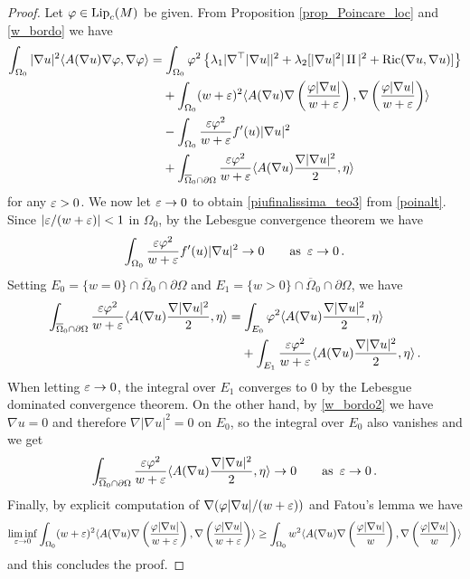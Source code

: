\documentclass[10 pt,a4paper]{article}
\theoremstyle{definition}
\begin{document}
\begin{proof}
	Let $\varphi\in\mathrm{Lip}_c(M)$ be given. From Proposition \ref{prop_Poincare_loc} and \eqref{w_bordo} we have
	\begin{equation} \label{poinalt}
		\begin{split}
			\int_{\Omega_0} |\nabla u|^2 \langle A(\nabla u)\nabla\varphi,\nabla\varphi\rangle & = \int_{\Omega_0} \varphi^2 \left\{ \lambda_1|\nabla^\top|\nabla u||^2 + \lambda_2 [|\nabla u|^2|\operatorname{II}|^2 + \mathrm{Ric}(\nabla u,\nabla u)] \right\} \\
			& \phantom{=\;} + \int_{\Omega_0} (w+\varepsilon)^2 \langle A(\nabla u)\nabla\left(\frac{\varphi|\nabla u|}{w+\varepsilon}\right),\nabla\left(\frac{\varphi|\nabla u|}{w+\varepsilon}\right)\rangle \\
			& \phantom{=\;} - \int_{\Omega_0} \frac{\varepsilon \varphi^2}{w+\varepsilon} f'(u)|\nabla u|^2 \\
			& \phantom{=\;} + \int_{\overline\Omega_0\cap\partial\Omega} \frac{\varepsilon\varphi^2}{w+\varepsilon} \langle A(\nabla u)\frac{\nabla|\nabla u|^2}{2},\eta\rangle
		\end{split}
	\end{equation}
	for any $\varepsilon>0$. We now let $\varepsilon\to0$ to obtain \eqref{piufinalissima_teo3} from \eqref{poinalt}. Since $|\varepsilon/(w+\varepsilon)|<1$ in $\Omega_0$, by the Lebesgue convergence theorem we have
	\[
	\int_{\Omega_0} \frac{\varepsilon \varphi^2}{w+\varepsilon} f'(u)|\nabla u|^2 \to 0 \qquad \text{as } \, \varepsilon \to 0 \, .
	\]
	Setting $E_0 = \{w=0\} \cap \overline\Omega_0\cap\partial\Omega$ and $E_1 = \{w>0\} \cap \overline\Omega_0\cap\partial\Omega$, we have
	\begin{align*}
		\int_{\overline\Omega_0\cap\partial\Omega} \frac{\varepsilon\varphi^2}{w+\varepsilon} \langle A(\nabla u)\frac{\nabla|\nabla u|^2}{2},\eta\rangle & = \int_{E_0} \varphi^2 \langle A(\nabla u)\frac{\nabla|\nabla u|^2}{2},\eta\rangle \\
		& \phantom{=\;} + \int_{E_1} \frac{\varepsilon\varphi^2}{w+\varepsilon} \langle A(\nabla u)\frac{\nabla|\nabla u|^2}{2},\eta\rangle \, .
	\end{align*}
	When letting $\varepsilon\to0$, the integral over $E_1$ converges to $0$ by the Lebesgue dominated convergence theorem. On the other hand, by \eqref{w_bordo2} we have $\nabla u = 0$ and therefore $\nabla|\nabla u|^2 = 0$ on $E_0$, so the integral over $E_0$ also vanishes and we get
	\[
	\int_{\overline\Omega_0\cap\partial\Omega} \frac{\varepsilon\varphi^2}{w+\varepsilon} \langle A(\nabla u)\frac{\nabla|\nabla u|^2}{2},\eta\rangle \to 0 \qquad \text{as } \, \varepsilon \to 0 \, .
	\]
	Finally, by explicit computation of $\nabla(\varphi|\nabla u|/(w+\varepsilon))$ and Fatou's lemma we have
	\[
	\liminf_{\varepsilon\to0} \int_{\Omega_0} (w+\varepsilon)^2 \langle A(\nabla u)\nabla\left(\frac{\varphi|\nabla u|}{w+\varepsilon}\right),\nabla\left(\frac{\varphi|\nabla u|}{w+\varepsilon}\right)\rangle \geq \int_{\Omega_0} w^2 \langle A(\nabla u)\nabla\left(\frac{\varphi|\nabla u|}{w}\right),\nabla\left(\frac{\varphi|\nabla u|}{w}\right)\rangle
	\]
	and this concludes the proof.
\end{proof}
\end{document}
